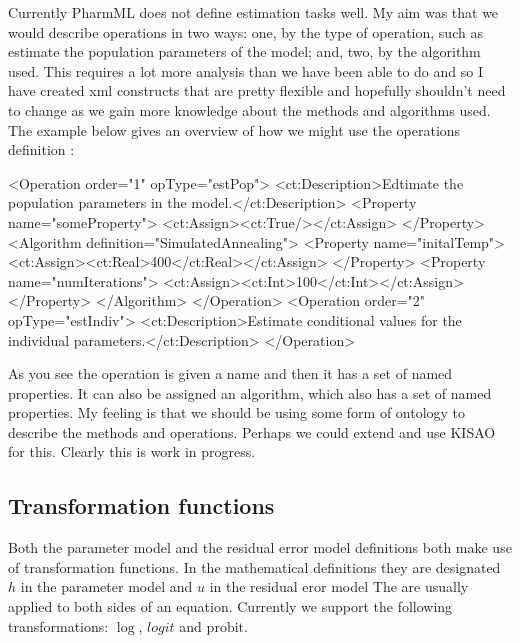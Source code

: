 \documentclass[a4paper,10pt]{article}
\newcommand{\pharmml}{PharmML\xspace}
\begin{document}
Currently \pharmml does not define estimation tasks well. My aim was
that we would describe operations in two ways: one, by the type of
operation, such as estimate the population parameters of the model;
and, two, by the algorithm used. This requires a lot more analysis
than we have been able to do and so I have created xml constructs
that are pretty flexible and hopefully shouldn't need to change as we
gain more knowledge about the methods and algorithms used. The example
below gives an overview of how we might use the operations definition :
%
\begin{xmlcode}
<Operation order="1" opType="estPop">
    <ct:Description>Edtimate the population parameters in the model.</ct:Description>
    <Property name="someProperty">
        <ct:Assign><ct:True/></ct:Assign>
    </Property>
    <Algorithm definition="SimulatedAnnealing">
        <Property name="initalTemp">
            <ct:Assign><ct:Real>400</ct:Real></ct:Assign>
        </Property>
        <Property name="numIterations">
            <ct:Assign><ct:Int>100</ct:Int></ct:Assign>
        </Property>
    </Algorithm>
</Operation>
<Operation order="2" opType="estIndiv">
    <ct:Description>Estimate conditional values for the individual parameters.</ct:Description>
</Operation>
\end{xmlcode}
As you see the operation is given a name and then it has a set
of named properties. It can also be assigned an algorithm, which 
also has a set of named properties. My feeling is that we should be
using some form of ontology to describe the methods and
operations. Perhaps we could extend and use KISAO for this. Clearly
this is work in progress.

\subsection{Transformation functions}

Both the parameter model and the residual error model definitions both
make use of transformation functions. In the mathematical definitions
they are designated $h$ in the parameter model and $u$ in the residual
eror model The are usually applied to both sides of an
equation. Currently we support the following transformations: $\log$,
$\mathit{logit}$ and $\mathrm{probit}$.
\end{document}
